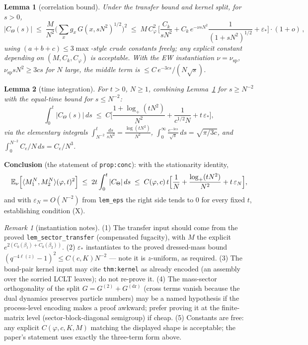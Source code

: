 \documentclass[11pt]{article}
\theoremstyle{plain}
\newtheorem{lemma}{Lemma}
\theoremstyle{remark}
\newtheorem{remark}{Remark}
\newcommand{\eps}{\varepsilon}\newcommand{\vp}{\varpi}
\begin{document}
\begin{lemma}[correlation bound]\label{lem:corrbound}
Under the transfer bound and kernel split, for $s>0$,
\[
  |C_\Theta(s)|\;\le\;\frac{M}{N^2}\Big(\sum_x g_x\,G(x,sN^2)^{1/2}\Big)^{\!2}
  \;\le\;M\,C_\varphi^2\,\Big[\frac{C_k}{sN^2}
  +C_k\,e^{-\nu sN^2}\frac{1}{(1+sN^2)^{1/2}}+\eps_\ast\Big]\cdot(1+o)\,,
\]
using $(a+b+c)\le3\max$-style crude constants freely; any explicit constant
depending on $(M,C_k,C_\varphi)$ is acceptable. With the EW instantiation
$\nu=\nu_{\mathrm{sp}}$, $\nu_{\mathrm{sp}}sN^2\ge 3cs$ for $N$ large, the middle
term is $\le C\,e^{-3cs}/(N\sqrt s)$.
\end{lemma}

\begin{lemma}[time integration]\label{lem:timeint}
For $t>0$, $N\ge1$, combining Lemma~\ref{lem:corrbound} for $s\ge N^{-2}$ with the
equal-time bound for $s\le N^{-2}$:
\[
  \int_0^t|C_\Theta(s)|\,ds\;\le\;
  C\Big[\frac{1+\log_+(tN^2)}{N^2}+\frac{1}{c^{1/2}N}+t\,\eps_\ast\Big],
\]
via the elementary integrals $\int_{N^{-2}}^t\frac{ds}{sN^2}=\frac{\log(tN^2)}{N^2}$,
$\int_0^\infty\frac{e^{-3cs}}{\sqrt s}\,ds=\sqrt{\pi/3c}$, and
$\int_0^{N^{-2}}C_e/N\,ds=C_e/N^3$.
\end{lemma}

\noindent\textbf{Conclusion} (the statement of \texttt{prop:conc}): with the
stationarity identity,
\[
  \E_\nu\Big[\langle M_1^N,M_2^N\rangle(\varphi,t)^2\Big]
  \;\le\;2t\int_0^t|C_\Theta|\,ds\;\le\;
  C(\varphi,c)\,t\Big[\frac1N+\frac{\log_+(tN^2)}{N^2}+t\,\eps_N\Big],
\]
and with $\eps_N=O(N^{-2})$ from \texttt{lem\_eps} the right side tends to $0$ for
every fixed $t$, establishing condition (X).

\begin{remark}[instantiation notes]
(1) The transfer input should come from the proved
\texttt{lem\_sector\_transfer} (compensated fugacity), with $M$ the explicit
$e^{2(C_0(\beta_1)+C_0(\beta_2))}$. (2) $\eps_\ast$ instantiates to the proved
dressed-mass bound $(q^{-4\ell(z)}-1)^2\le C(c,K)N^{-2}$ --- note it is
$z$-uniform, as required. (3) The bond-pair kernel input may cite
\texttt{thm:kernel} as already encoded (an assembly over the sorried LCLT leaves);
do not re-prove it. (4) The mass-sector orthogonality of the split
$G=G^{(2)}+G^{(\mathrm{dr})}$ (cross terms vanish because the dual dynamics
preserves particle numbers) may be a named hypothesis if the process-level
encoding makes a proof awkward; prefer proving it at the finite-matrix level
(sector-block-diagonal semigroup) if cheap. (5) Constants are free: any explicit
$C(\varphi,c,K,M)$ matching the displayed shape is acceptable; the paper's
statement uses exactly the three-term form above.
\end{remark}
\end{document}
